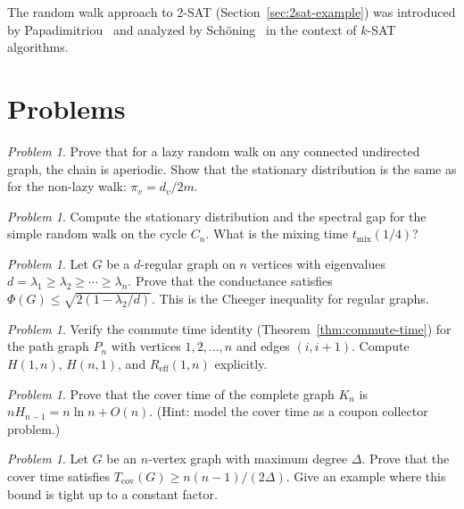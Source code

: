 \documentclass[twoside,12pt]{book}
\theoremstyle{plain}
\theoremstyle{definition}
\theoremstyle{remark}
\newtheorem{problem}[theorem]{Problem}
\begin{document}
The random walk approach to 2-SAT (Section~\ref{sec:2sat-example}) was
introduced by Papadimitriou~\cite{Papadimitriou1991} and analyzed by
Sch\"oning~\cite{Schoninger1993} in the context of $k$-SAT algorithms.

\section*{Problems}

\begin{problem}
Prove that for a lazy random walk on any connected undirected graph, the
chain is aperiodic. Show that the stationary distribution is the same as
for the non-lazy walk: $\pi_v = d_v / 2m$.
\end{problem}

\begin{problem}
Compute the stationary distribution and the spectral gap for the simple
random walk on the cycle $C_n$. What is the mixing time $t_{\mathrm{mix}}(1/4)$?
\end{problem}

\begin{problem}
Let $G$ be a $d$-regular graph on $n$ vertices with eigenvalues
$d = \lambda_1 \geq \lambda_2 \geq \cdots \geq \lambda_n$. Prove that the
conductance satisfies $\Phi(G) \leq \sqrt{2(1 - \lambda_2/d)}$. This is
the Cheeger inequality for regular graphs.
\end{problem}

\begin{problem}
Verify the commute time identity (Theorem~\ref{thm:commute-time}) for the
path graph $P_n$ with vertices $1, 2, \ldots, n$ and edges $(i, i+1)$.
Compute $H(1, n)$, $H(n, 1)$, and $R_{\mathrm{eff}}(1, n)$ explicitly.
\end{problem}

\begin{problem}
Prove that the cover time of the complete graph $K_n$ is $n H_{n-1} =
n \ln n + O(n)$. (Hint: model the cover time as a coupon collector
problem.)
\end{problem}

\begin{problem}
Let $G$ be an $n$-vertex graph with maximum degree $\Delta$. Prove that the
cover time satisfies $T_{\mathrm{cov}}(G) \geq n(n-1)/(2\Delta)$.
Give an example where this bound is tight up to a constant factor.
\end{problem}
\end{document}
